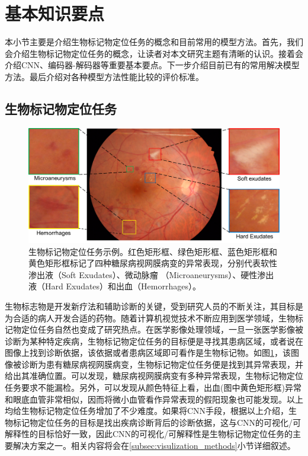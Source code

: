 \section{基本知识要点}
本小节主要是介绍生物标记物定位任务的概念和目前常用的模型方法。首先，我们会介绍生物标记物定位任务的概念，让读者对本文研究主题有清晰的认识。接着会介绍CNN、编码器-解码器等重要基本要点。下一步介绍目前已有的常用解决模型方法。最后介绍对各种模型方法性能比较的评价标准。
\subsection{生物标记物定位任务}\label{subsec:bio_loc_task_definition}
\begin{figure}[h]
	\centering
	\includegraphics[width=1.0\textwidth]{figure/biomarker_localization_example}
	\caption{生物标记物定位任务示例。红色矩形框、绿色矩形框、蓝色矩形框和黄色矩形框标记了四种糖尿病视网膜病变的异常表现，分别代表软性渗出液（Soft Exudates）、微动脉瘤
		（Microaneurysms）、硬性渗出液（Hard Exudates）和出血（Hemorrhages）。} 
	\label{fig:biomarker_localization_example}
\end{figure}
生物标志物是开发新疗法和辅助诊断的关键，受到研究人员的不断关注，其目标是为合适的病人开发合适的药物。随着计算机视觉技术不断应用到医学领域，生物标记物定位任务自然也变成了研究热点。在医学影像处理领域，一旦一张医学影像被诊断为某种特定疾病，生物标记物定位任务的目标便是寻找其患病区域，或者说在图像上找到诊断依据，该依据或者患病区域即可看作是生物标记物。如图\ref{fig:biomarker_localization_example}，该图像被诊断为患有糖尿病视网膜病变，生物标记物定位任务便是找到其异常表现，并给出其准确位置。可以发现，糖尿病视网膜病变有多种异常表现，生物标记物定位任务要求不能漏检。另外，可以发现从颜色特征上看，出血(图中黄色矩形框)异常和眼底血管非常相似，因而将微小血管看作异常表现的假阳现象也可能发现。以上均给生物标记物定位任务增加了不少难度。如果将CNN手段，根据以上介绍，生物标记物定位任务的目标是找出疾病诊断背后的诊断依据，这与CNN的可视化/可解释性的目标恰好一致，因此CNN的可视化/可解释性是生物标记物定位任务的主要解决方案之一。相关内容将会在\ref{subsec:visulization_methods}小节详细叙述。
